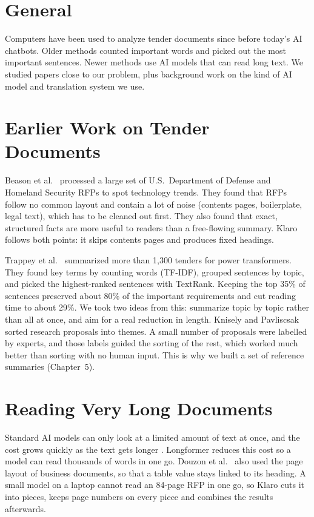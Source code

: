 \documentclass[11pt,a4paper,oneside]{report}
\begin{document}
\section{General}
Computers have been used to analyze tender documents since before today's AI chatbots. Older methods
counted important words and picked out the most important sentences. Newer methods use AI models
that can read long text. We studied papers close to our problem, plus background work on the kind of
AI model and translation system we use.

\section{Earlier Work on Tender Documents}
Beason et al.~\cite{beason2021} processed a large set of U.S.\ Department of Defense and Homeland
Security RFPs to spot technology trends. They found that RFPs follow no common layout and contain a
lot of noise (contents pages, boilerplate, legal text), which has to be cleaned out first. They also
found that exact, structured facts are more useful to readers than a free-flowing summary. Klaro
follows both points: it skips contents pages and produces fixed headings.

Trappey et al.~\cite{trappey2022} summarized more than 1,300 tenders for power transformers. They
found key terms by counting words (TF-IDF), grouped sentences by topic, and picked the highest-ranked
sentences with TextRank. Keeping the top 35\% of sentences preserved about 80\% of the important
requirements and cut reading time to about 29\%. We took two ideas from this: summarize topic by
topic rather than all at once, and aim for a real reduction in length. Knisely and
Pavliscsak~\cite{knisely2023} sorted research proposals into themes. A small number of proposals
were labelled by experts, and those labels guided the sorting of the rest, which worked much better
than sorting with no human input. This is why we built a set of reference summaries (Chapter~5).

\section{Reading Very Long Documents}
Standard AI models can only look at a limited amount of text at once, and the cost grows quickly as
the text gets longer \cite{vaswani2017}. Longformer \cite{beltagy2020} reduces this cost so a model
can read thousands of words in one go. Douzon et al.~\cite{douzon2023} also used the page layout of
business documents, so that a table value stays linked to its heading. A small model on a laptop
cannot read an 84-page RFP in one go, so Klaro cuts it into pieces, keeps page numbers on every piece
and combines the results afterwards.
\end{document}
